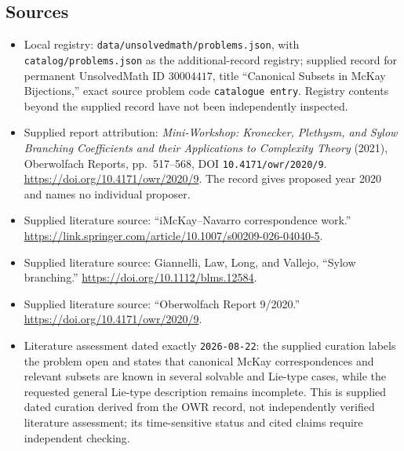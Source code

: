 \documentclass[11pt]{article}
\begin{document}
\subsection{Sources}
\begin{itemize}
\item Local registry: \texttt{data/unsolvedmath/problems.json}, with \texttt{catalog/problems.json} as the additional-record registry; supplied record for permanent UnsolvedMath ID \(30004417\), title ``Canonical Subsets in McKay Bijections,'' exact source problem code \texttt{catalogue entry}. Registry contents beyond the supplied record have not been independently inspected.
\item Supplied report attribution: \emph{Mini-Workshop: Kronecker, Plethysm, and Sylow Branching Coefficients and their Applications to Complexity Theory} (2021), Oberwolfach Reports, pp.\ 517--568, DOI \texttt{10.4171/owr/2020/9}. \url{https://doi.org/10.4171/owr/2020/9}. The record gives proposed year 2020 and names no individual proposer.
\item Supplied literature source: ``iMcKay--Navarro correspondence work.'' \url{https://link.springer.com/article/10.1007/s00209-026-04040-5}.
\item Supplied literature source: Giannelli, Law, Long, and Vallejo, ``Sylow branching.'' \url{https://doi.org/10.1112/blms.12584}.
\item Supplied literature source: ``Oberwolfach Report 9/2020.'' \url{https://doi.org/10.4171/owr/2020/9}.
\item Literature assessment dated exactly \texttt{2026-08-22}: the supplied curation labels the problem open and states that canonical McKay correspondences and relevant subsets are known in several solvable and Lie-type cases, while the requested general Lie-type description remains incomplete. This is supplied dated curation derived from the OWR record, not independently verified literature assessment; its time-sensitive status and cited claims require independent checking.
\end{itemize}
\end{document}
